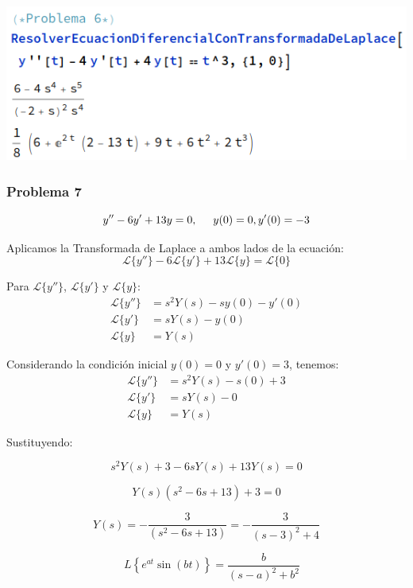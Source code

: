 \documentclass{article}
\begin{document}
\begin{center}
    \includegraphics[width=1\textwidth]{../../ED 2/image7.png}
\end{center}


\newpage


\subsubsection{Problema 7}

\[y'' - 6y' + 13y = 0, \hspace{.5cm} y(0) = 0, y'(0) = -3\]

Aplicamos la Transformada de Laplace a ambos lados de la ecuación:
\[
    \mathcal{L}\{y''\} - 6\mathcal{L}\{y'\} + 13\mathcal{L}\{y\} = \mathcal{L}\{0\}
\]

Para \(\mathcal{L}\{y''\}\), \(\mathcal{L}\{y'\}\) y \(\mathcal{L}\{y\}\):
\begin{align*}
    \mathcal{L}\{y''\} & = s^2Y(s) - sy(0) - y'(0) \\
    \mathcal{L}\{y'\}  & = sY(s) - y(0)            \\
    \mathcal{L}\{y\}   & = Y(s)
\end{align*}

Considerando la condición inicial $y(0) = 0$ y $y'(0) = 3$, tenemos:
\begin{align*}
    \mathcal{L}\{y''\} & = s^2Y(s) - s(0) + 3 \\
    \mathcal{L}\{y'\}  & = sY(s) - 0          \\
    \mathcal{L}\{y\}   & = Y(s)
\end{align*}

Sustituyendo:

\[
    s^2Y(s) + 3 - 6sY(s) + 13Y(s) = 0
\]

\[
    Y(s)(s^2 - 6s + 13) + 3 = 0
\]

\[
    Y(s) = -\frac{3}{(s^2 - 6s + 13)} =  -\frac{3}{(s-3)^2+4}
\]

\[
    \quad L\left\{e^{at} \sin(bt)\right\} = \frac{b}{(s - a)^2 + b^2}
\]
\end{document}
